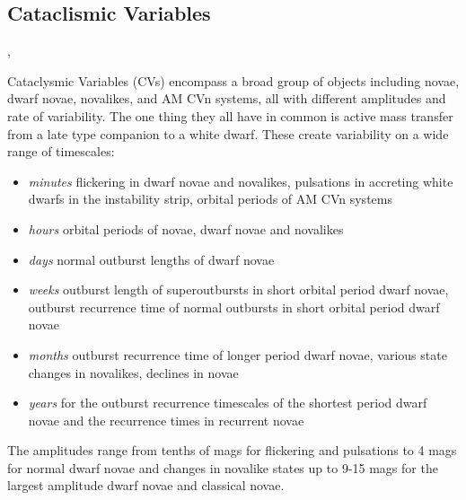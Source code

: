 %
%
%
%

\subsection{Cataclismic Variables}
\def\secname{\chpname:CVtransients}\label{sec:\secname}

,

Cataclysmic Variables (CVs) encompass a broad group of objects
including novae, dwarf novae, novalikes, and AM CVn systems, all with different
amplitudes and rate of variability. The one thing they all have in
common is active mass transfer from a late type companion to a
white dwarf. These create variability on a wide range of timescales:

\begin{itemize}
	\item \textit{minutes} flickering in
dwarf novae and novalikes, pulsations in accreting white dwarfs in
the instability strip, orbital periods of AM CVn systems
\item \textit{hours} orbital periods of novae, dwarf novae and novalikes
\item \textit{days} normal outburst lengths of dwarf novae 
\item \textit{weeks} outburst length of superoutbursts in short orbital period
dwarf novae, outburst recurrence time of normal outbursts in short
orbital period dwarf novae 
\item \textit{months} outburst recurrence time of
longer period dwarf novae, various state changes in novalikes, declines
in novae 
\item \textit{years} for the outburst recurrence timescales of the
shortest period dwarf novae and the recurrence times in recurrent novae
\end{itemize}
The
amplitudes range from tenths of mags for flickering and pulsations to 4 mags
for normal dwarf novae and changes in novalike states up to 9-15 mags for the
largest amplitude dwarf novae and classical novae.

